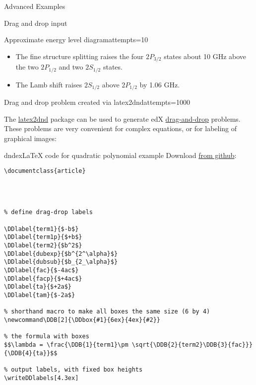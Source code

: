 \begin{edXchapter}{Advanced Examples}
\begin{edXsection}{Drag and drop input}
\begin{edXvertical}
\begin{edXproblem}{Approximate energy level diagram}{attempts=10}
\begin{edXsolution}
\begin{itemize}

\item The fine structure splitting raises the four $2P_{3/2}$ states about
10 GHz above the two $2P_{1/2}$ and two $2S_{1/2}$ states.

\item The Lamb shift raises $2S_{1/2}$ above $2P_{1/2}$ by 1.06 GHz.

\end{itemize}

\end{edXsolution}

\end{edXproblem}


\end{edXvertical}


\begin{edXvertical}

\begin{edXproblem}{Drag and drop problem created via latex2dnd}{attempts=1000}

The \href{https://github.com/mitocw/latex2dnd}{latex2dnd} package can
be used to generate edX
\href{http://edx.readthedocs.org/projects/devdata/en/latest/course_data_formats/drag_and_drop/drag_and_drop_input.html}{drag-and-drop}
problems.  These problems are very convenient for complex equations,
or for labeling of graphical images:

\begin{edXshowhide}{dndex}{LaTeX code for quadratic polynomial example}
Download \href{https://github.com/mitocw/latex2dnd/blob/master/latex2dnd/testtex/quadratic.tex}{from github}:
\begin{verbatim}
\documentclass{article}




% define drag-drop labels

\DDlabel{term1}{$-b$}
\DDlabel{term1p}{$+b$}
\DDlabel{term2}{$b^2$}
\DDlabel{dubexp}{$b^{2^\alpha}$}
\DDlabel{dubsub}{$b_{2_\alpha}$}
\DDlabel{fac}{$-4ac$}
\DDlabel{facp}{$+4ac$}
\DDlabel{ta}{$+2a$}
\DDlabel{tam}{$-2a$}

% shorthand macro to make all boxes the same size (6 by 4)
\newcommand\DDB[2]{\DDbox{#1}{6ex}{4ex}{#2}}

% the formula with boxes
$$\lambda = \frac{\DDB{1}{term1}\pm \sqrt{\DDB{2}{term2}\DDB{3}{fac}}}{\DDB{4}{ta}}$$

% output labels, with fixed box heights
\writeDDlabels[4.3ex]



\end{verbatim}
\end{edXshowhide}
\end{edXproblem}
\end{edXvertical}
\end{edXsection}
\end{edXchapter}
